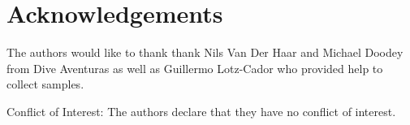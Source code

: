\documentclass[smallextended]{svjour3}       %
\begin{document}
\section{Acknowledgements}\label{acknowledgements}

The authors would like to thank thank Nils Van Der Haar and Michael
Doodey from Dive Aventuras as well as Guillermo Lotz-Cador who provided
help to collect samples.

Conflict of Interest: The authors declare that they have no conflict of
interest.



\end{document}
